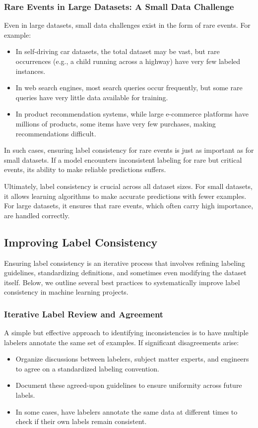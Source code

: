 \documentclass[12pt,openany, draft]{book}
\begin{document}
\subsubsection{Rare Events in Large Datasets: A Small Data Challenge}
Even in large datasets, small data challenges exist in the form of rare events. For example:
\begin{itemize}
    \item In self-driving car datasets, the total dataset may be vast, but rare occurrences (e.g., a child running across a highway) have very few labeled instances.
    \item In web search engines, most search queries occur frequently, but some rare queries have very little data available for training.
    \item In product recommendation systems, while large e-commerce platforms have millions of products, some items have very few purchases, making recommendations difficult.
\end{itemize}

In such cases, ensuring label consistency for rare events is just as important as for small datasets. If a model encounters inconsistent labeling for rare but critical events, its ability to make reliable predictions suffers. \newline

Ultimately, label consistency is crucial across all dataset sizes. For small datasets, it allows learning algorithms to make accurate predictions with fewer examples. For large datasets, it ensures that rare events, which often carry high importance, are handled correctly.

\subsection{Improving Label Consistency}

Ensuring label consistency is an iterative process that involves refining labeling guidelines, standardizing definitions, and sometimes even modifying the dataset itself. Below, we outline several best practices to systematically improve label consistency in machine learning projects.

\subsubsection{Iterative Label Review and Agreement}
A simple but effective approach to identifying inconsistencies is to have multiple labelers annotate the same set of examples. If significant disagreements arise:
\begin{itemize}
    \item Organize discussions between labelers, subject matter experts, and engineers to agree on a standardized labeling convention.
    \item Document these agreed-upon guidelines to ensure uniformity across future labels.
    \item In some cases, have labelers annotate the same data at different times to check if their own labels remain consistent.
\end{itemize}
\end{document}
